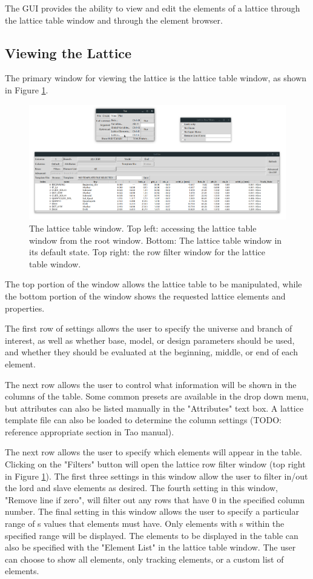 The GUI provides the ability to view and edit the elements of a lattice through the lattice table window and through the element browser.

\subsection{Viewing the Lattice}
\label{s:gui.lat.table}

The primary window for viewing the lattice is the lattice table window, as shown in Figure \ref{fig:gui.lat.table}.
\begin{figure}
\centering
\includegraphics[width=12cm]{figures/lat_table.png}
\caption{The lattice table window.
Top left: accessing the lattice table window from the root window.
Bottom: The lattice table window in its default state.
Top right: the row filter window for the lattice table window.}
\label{fig:gui.lat.table}
\end{figure}
The top portion of the window allows the lattice table to be manipulated, while the bottom portion of the window shows the requested lattice elements and properties.

The first row of settings allows the user to specify the universe and branch of interest, as well as whether base, model, or design parameters should be used, and whether they should be evaluated at the beginning, middle, or end of each element.

The next row allows the user to control what information will be shown in the columns of the table.
Some common presets are available in the drop down menu, but attributes can also be listed manually in the "Attributes" text box.
A lattice template file can also be loaded to determine the column settings (TODO: reference appropriate section in Tao manual).

The next row allows the user to specify which elements will appear in the table.
Clicking on the "Filters" button will open the lattice row filter window (top right in Figure \ref{fig:gui.lat.table}).
The first three settings in this window allow the user to filter in/out the lord and slave elements as desired.
The fourth setting in this window, "Remove line if zero", will filter out any rows that have $0$ in the specified column number.
The final setting in this window allows the user to specify a particular range of s values that elements must have.
Only elements with s within the specified range will be displayed.
The elements to be displayed in the table can also be specified with the "Element List" in the lattice table window.
The user can choose to show all elements, only tracking elements, or a custom list of elements.

